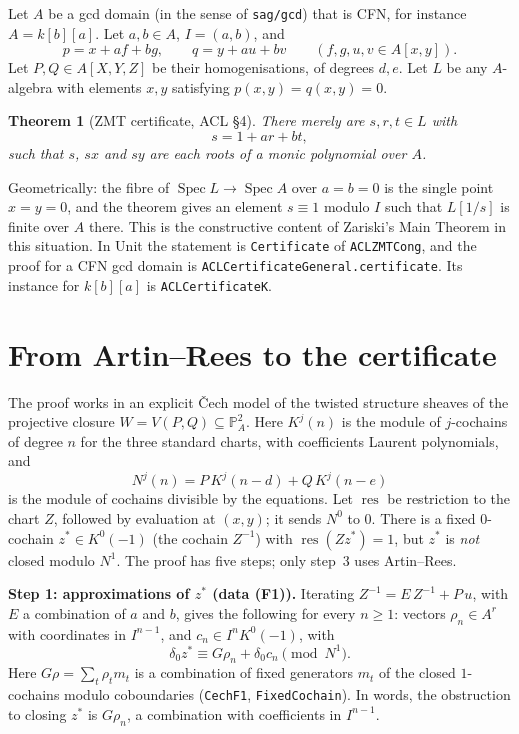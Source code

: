 \documentclass[11pt]{amsart}
\newtheorem{theorem}{Theorem}
\theoremstyle{definition}
\theoremstyle{remark}
\DeclareMathOperator{\res}{res}
\begin{document}
Let $A$ be a gcd domain (in the sense of \texttt{sag/gcd}) that is CFN,
for instance $A=k[b][a]$. Let $a,b\in A$, $I=(a,b)$, and
\[
 p=x+af+bg,\qquad q=y+au+bv\qquad(f,g,u,v\in A[x,y]).
\]
Let $P,Q\in A[X,Y,Z]$ be their homogenisations, of degrees $d,e$. Let
$L$ be any $A$-algebra with elements $x,y$ satisfying $p(x,y)=q(x,y)=0$.

\begin{theorem}[ZMT certificate, ACL \S4]\label{thm:acl}
There merely are $s,r,t\in L$ with
\[
 s=1+ar+bt,
\]
such that $s$, $sx$ and $sy$ are each roots of a monic polynomial over
$A$.
\end{theorem}

Geometrically: the fibre of $\operatorname{Spec}L\to\operatorname{Spec}A$
over $a=b=0$ is the single point $x=y=0$, and the theorem gives an
element $s\equiv1$ modulo $I$ such that $L[1/s]$ is finite over $A$
there. This is the constructive content of Zariski's Main Theorem
in this situation. In Unit the statement is \texttt{Certificate} of
\texttt{ACLZMTCong}, and the proof for a CFN gcd domain is
\texttt{ACLCertificateGeneral.certificate}. Its instance for $k[b][a]$ is
\texttt{ACLCertificateK}.

\section{From Artin--Rees to the certificate}

The proof works in an explicit Čech model of the twisted structure
sheaves of the projective closure $W=V(P,Q)\subseteq\mathbb P^2_A$.
Here $K^j(n)$ is the module of $j$-cochains of degree $n$ for the
three standard charts, with coefficients Laurent polynomials, and
\[
 N^j(n)=P\,K^j(n-d)+Q\,K^j(n-e)
\]
is the module of cochains divisible by the equations.
Let $\res$ be restriction to the chart $Z$, followed by evaluation at
$(x,y)$; it sends $N^0$ to $0$. There is a fixed $0$-cochain
$z^*\in K^0(-1)$ (the cochain $Z^{-1}$) with $\res(Zz^*)=1$, but $z^*$ is
\emph{not} closed modulo $N^1$. The proof has five steps; only step~3
uses Artin--Rees.

\medskip\noindent\textbf{Step 1: approximations of $z^*$ (data (F1)).}
Iterating $Z^{-1}=E\,Z^{-1}+P\,u$, with $E$ a combination of $a$ and $b$,
gives the following for every $n\ge1$: vectors $\rho_n\in A^r$ with
coordinates in $I^{n-1}$, and $c_n\in I^nK^0(-1)$, with
\[
 \delta_0z^*\equiv G\rho_n+\delta_0c_n\pmod{N^1}.\tag{$\beta_n$}
\]
Here $G\rho=\sum_t\rho_tm_t$ is a combination of fixed generators $m_t$
of the closed $1$-cochains modulo coboundaries (\texttt{CechF1},
\texttt{FixedCochain}). In words, the obstruction to closing $z^*$ is
$G\rho_n$, a combination with coefficients in $I^{n-1}$.
\end{document}
